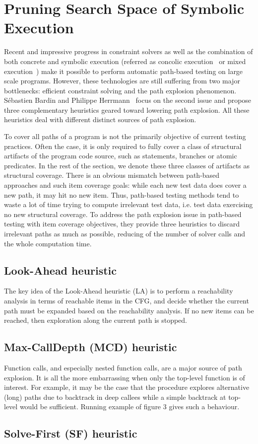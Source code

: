 \section{Pruning Search Space of Symbolic Execution}
Recent and impressive progress in constraint solvers as well as the combination of both concrete and symbolic execution (referred as concolic execution~\cite{cute,compositional} or mixed execution~\cite{mixed}) make it possible to perform automatic path-based testing on large scale programs. However, these technologies are still suffering from two major bottlenecks: efficient constraint solving and the path explosion phenomenon. S\'{e}bastien Bardin and Philippe Herrmann~\cite{prune} focus on the second issue and propose three complementary heuristics geared toward lowering path explosion. All these heuristics deal with different distinct sources of path explosion. 

To cover all paths of a program is not the primarily objective of current testing practices. Often the case, it is only required to fully cover a class of structural artifacts of the program code source, such as statements, branches or atomic predicates. In the rest of the section, we denote these three classes of artifacts as structural coverage. There is an obvious mismatch between path-based approaches and such item coverage goals: while each new test data does cover a new path, it may hit no new item. Thus, path-based testing methods tend to waste a lot of time trying to compute irrelevant test data, i.e. test data exercising no new structural coverage. To address the path explosion issue in path-based testing with item coverage objectives, they provide three heuristics to discard irrelevant paths as much as possible, reducing of the number of solver calls and the whole computation time. 

\subsection{Look-Ahead heuristic}
The key idea of the Look-Ahead heuristic (LA) is to perform a reachability analysis in terms of reachable items in the CFG, and decide whether the current
path must be expanded based on the reachability analysis. If no new items can be reached, then exploration along the current path is stopped.

\subsection{Max-CallDepth (MCD) heuristic}
Function calls, and especially nested function calls, are a major source of path explosion. It is all the more embarrassing when only the top-level function is of
interest. For example, it may be the case that the procedure explores alternative (long) paths due to backtrack in deep callees while a simple backtrack at top-level would be sufficient. Running example of figure 3 gives such a behaviour.



\subsection{Solve-First (SF) heuristic}